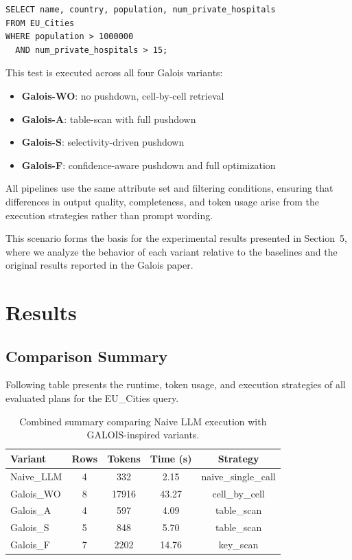 \documentclass[12pt]{article}
\begin{document}
\begin{verbatim}
SELECT name, country, population, num_private_hospitals
FROM EU_Cities
WHERE population > 1000000
  AND num_private_hospitals > 15;
\end{verbatim}

This test is executed across all four Galois variants:
\begin{itemize}
    \item \textbf{Galois-WO}: no pushdown, cell-by-cell retrieval
    \item \textbf{Galois-A}: table-scan with full pushdown
    \item \textbf{Galois-S}: selectivity-driven pushdown
    \item \textbf{Galois-F}: confidence-aware pushdown and full optimization
\end{itemize}

All pipelines use the same attribute set and filtering conditions, ensuring that differences in output quality, completeness, and token usage arise from the execution strategies rather than prompt wording.

This scenario forms the basis for the experimental results presented in Section~5, where we analyze the behavior of each variant relative to the baselines and the original results reported in the Galois paper.


\section{Results}


\subsection{Comparison Summary}

Following table presents the runtime, token usage, and execution strategies of all evaluated plans for the EU\_Cities query.

\begin{table}[H]
\centering
\begin{tabular}{lcccc}
\hline
\textbf{Variant} & \textbf{Rows} & \textbf{Tokens} & \textbf{Time (s)} & \textbf{Strategy} \\
\hline
Naive\_LLM & 4 & 332   & 2.15  & naive\_single\_call \\
Galois\_WO & 8 & 17916 & 43.27 & cell\_by\_cell \\
Galois\_A  & 4 & 597   & 4.09  & table\_scan \\
Galois\_S  & 5 & 848   & 5.70  & table\_scan \\
Galois\_F  & 7 & 2202  & 14.76 & key\_scan \\
\hline
\end{tabular}
\caption{Combined summary comparing Naive LLM execution with GALOIS-inspired variants.}
\label{tab:combined-summary}
\end{table}
\end{document}
